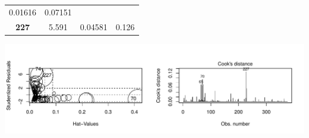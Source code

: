 \documentclass[]{elsarticle} %
\makeatletter
\def\maxwidth{\ifdim\Gin@nat@width>\linewidth\linewidth
\else\Gin@nat@width\fi}
\let\Oldincludegraphics\includegraphics
\renewcommand{\includegraphics}[1]{\Oldincludegraphics[width=\maxwidth]{#1}}
\makeatother
\begin{document}
\begin{longtable}[]{@{}cccc@{}}
\begin{minipage}[t]{0.10\columnwidth}
0.01616\strut
\end{minipage} & \begin{minipage}[t]{0.10\columnwidth}\centering\strut
0.07151\strut
\end{minipage}\tabularnewline
\begin{minipage}[t]{0.12\columnwidth}\centering\strut
\textbf{227}\strut
\end{minipage} & \begin{minipage}[t]{0.12\columnwidth}\centering\strut
5.591\strut
\end{minipage} & \begin{minipage}[t]{0.10\columnwidth}\centering\strut
0.04581\strut
\end{minipage} & \begin{minipage}[t]{0.10\columnwidth}\centering\strut
0.126\strut
\end{minipage}\tabularnewline
\bottomrule
\end{longtable}

\includegraphics{Final_Project_files/figure-latex/unnamed-chunk-12-1.pdf}
\end{document}
